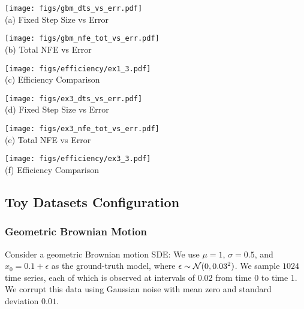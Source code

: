 \documentclass[twoside]{article}
\begin{document}
\begin{figure*}[ht]\label{fig:additional_numerical_study}
\begin{minipage}[t]{0.333\linewidth}
\centering
{\texttt{[image: figs/gbm\_dts\_vs\_err.pdf]}} \\ \vspace{-0.10cm}
(a) \footnotesize{Fixed Step Size vs Error}
\end{minipage}
\begin{minipage}[t]{0.333\linewidth}
\centering
\texttt{[image: figs/gbm\_nfe\_tot\_vs\_err.pdf]} \\ \vspace{-0.10cm}
(b) \footnotesize{Total NFE vs Error}
\end{minipage}
\begin{minipage}[t]{0.333\linewidth}
\centering
\texttt{[image: figs/efficiency/ex1\_3.pdf]} \\ \vspace{-0.10cm}
(c) \footnotesize{Efficiency Comparison}
\end{minipage}
\begin{minipage}[t]{0.333\linewidth}
\centering
{\texttt{[image: figs/ex3\_dts\_vs\_err.pdf]}} \\ \vspace{-0.10cm}
(d) \footnotesize{Fixed Step Size vs Error}
\end{minipage}
\begin{minipage}[t]{0.333\linewidth}
\centering
\texttt{[image: figs/ex3\_nfe\_tot\_vs\_err.pdf]} \\ \vspace{-0.10cm}
(e) \footnotesize{Total NFE vs Error}
\end{minipage}
\begin{minipage}[t]{0.333\linewidth}
\centering
\texttt{[image: figs/efficiency/ex3\_3.pdf]} \\ \vspace{-0.10cm}
(f) \footnotesize{Efficiency Comparison}
\end{minipage}
\caption{
(a-c) Example 1. (d-f) Example 3.
}
\end{figure*}
 \subsection{Toy Datasets Configuration}\label{app:toy_datasets}
\subsubsection{Geometric Brownian Motion}
Consider a geometric Brownian motion SDE:
We use $\mu=1$, $\sigma=0.5$, and $x_0=0.1 + \epsilon$ as the ground-truth model, where $\epsilon \sim \mathcal{N}(0, 0.03^2)$. We sample $1024$ time series, each of which is observed at intervals of 0.02 from time 0 to time 1. We corrupt this data using Gaussian noise with mean zero and standard deviation $0.01$.
\end{document}
